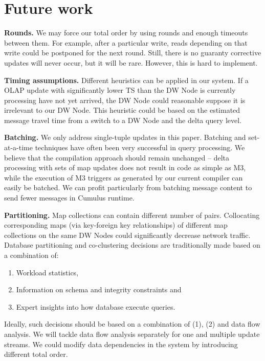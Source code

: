\documentclass{sig-semester}
\def\OLAP{OLAP\xspace}
\def\M3{M3\xspace}
\begin{document}
\section{Future work}
\label{sec:Future}
\vspace{2mm}

\textbf{Rounds.} We may force our total order by using rounds and enough timeouts between them. For example, after a particular write, reads depending on that write could be postponed for the next round. Still, there is no guaranty corrective updates will never occur, but it will be rare. However, this is hard to implement.

\textbf{Timing assumptions.} Different heuristics can be applied in our system. If a \OLAP update with significantly lower TS than the DW Node is currently processing have not yet arrived, the DW Node could reasonable suppose it is irrelevant to our DW Node. This heuristic could be based on the estimated message travel time from a switch to a DW Node and the delta query level.

\textbf{Batching.} We only address single-tuple updates in this paper.
Batching and set-at-a-time techniques have often been
very successful in query processing.
We believe that the compilation approach
should remain unchanged -- delta processing with sets of map updates does not
result in code as simple as \M3, while the
execution of \M3 triggers as generated by our current compiler
can easily be batched. We can profit
particularly from batching message content to send fewer messages in
Cumulus runtime.

\textbf{Partitioning.}
Map collections can contain different number of pairs. Collocating corresponding maps (via key-foreign key relationships) of different map collections on the same DW Nodes could significantly decrease network traffic. Database partitioning and co-clustering decisions are traditionally made based on a combination of: 
\begin{enumerate}[(1)]
 \item Workload statistics, 
 \item Information on schema and integrity constraints and
 \item Expert insights into how database execute queries.
\end{enumerate}

Ideally, such decisions should be based on a combination of (1), (2) and data flow analysis. We will tackle data flow analysis separately for one and multiple update streams. We could modify data dependencies in the system by introducing different total order.
\end{document}
